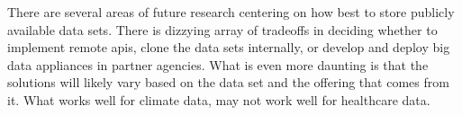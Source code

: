 There are several areas of future research centering on how best to store publicly available data sets. There is dizzying array of tradeoffs in deciding whether to implement remote \gls{api}s, clone the data sets internally, or develop and deploy big data appliances in partner agencies. What is even more daunting is that the solutions will likely vary based on the data set and the offering that comes from it. What works well for climate data, may not work well for healthcare data.\\